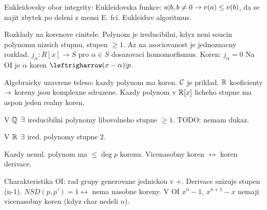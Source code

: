 Eukleidovsky obor integrity: Eukleidovska funkce: $a|b,b\neq 0\rightarrow v(a)\leq
v(b)$, da se najit zbytek po deleni z mensi E. fci. Eukleiduv algoritmus.

Rozklady na korenove cinitele.
Polynom je ireducibilni, kdyz neni soucin polynomu nizsich stupnu, stupen $\geq
1$. Az na asociovanost je jednoznacny rozklad.
$j_\alpha:R[x]\rightarrow S$ pro $\alpha\in S$ dosazovaci homomorfismus.
Koren: $j_\alpha=0$
Na OI je $\alpha$ koren $\leftrigharrow (x-\alpha)|p$.

Algebraicky uzavrene teleso: kazdy polynom ma koren.
$\mathcal{C}$ je priklad. $\mathbb{R}$ koeficienty $\rightarrow$ koreny jsou komplexne sdruzene.
Kazdy polynom v $\mathbb{R}[x]$ licheho stupne ma aspon jeden realny koren.

V $\mathbb{Q}$ $\exists$ ireducibilni polynomy libovolneho stupne $\geq 1$.
TODO: nemam dukaz.

V $\mathbb{R}$ $\exists$ ired. polynomy stupne 2.

Kazdy nenul. polynom ma $\leq\deg p$ korenu. Vicenasobny koren
$\leftrightarrow$ koren derivace.

Charakteristika OI: rad grupy generovane jednickou v +.
Derivace snizuje stupen (n-1).
$NSD(p,p')=1\leftrightarrow$ nema nasobne koreny.
V OI $x^n-1$, $x^{n+1}-x$ nemaji vicenasobny koren (kdyz char nedeli $n$).
